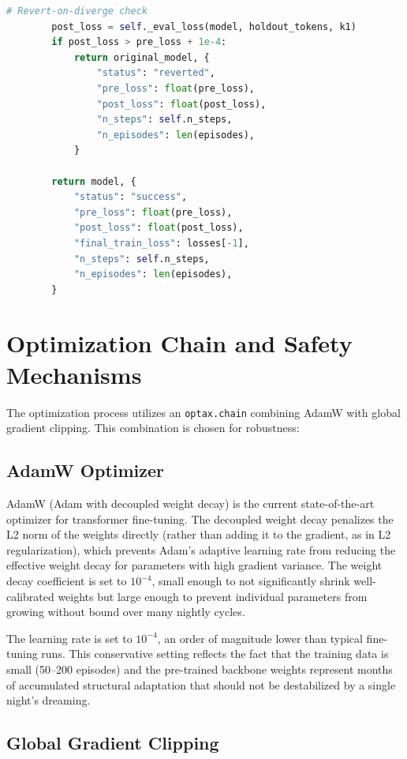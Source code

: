 \begin{lstlisting}[language=python]
        # Revert-on-diverge check
        post_loss = self._eval_loss(model, holdout_tokens, k1)
        if post_loss > pre_loss + 1e-4:
            return original_model, {
                "status": "reverted",
                "pre_loss": float(pre_loss),
                "post_loss": float(post_loss),
                "n_steps": self.n_steps,
                "n_episodes": len(episodes),
            }

        return model, {
            "status": "success",
            "pre_loss": float(pre_loss),
            "post_loss": float(post_loss),
            "final_train_loss": losses[-1],
            "n_steps": self.n_steps,
            "n_episodes": len(episodes),
        }
\end{lstlisting}

\section{Optimization Chain and Safety Mechanisms}

The optimization process utilizes an \texttt{optax.chain} combining AdamW with global gradient clipping. This combination is chosen for robustness:

\subsection{AdamW Optimizer}

AdamW (Adam with decoupled weight decay) is the current state-of-the-art optimizer for transformer fine-tuning. The decoupled weight decay penalizes the L2 norm of the weights directly (rather than adding it to the gradient, as in L2 regularization), which prevents Adam's adaptive learning rate from reducing the effective weight decay for parameters with high gradient variance. The weight decay coefficient is set to $10^{-4}$, small enough to not significantly shrink well-calibrated weights but large enough to prevent individual parameters from growing without bound over many nightly cycles.

The learning rate is set to $10^{-4}$, an order of magnitude lower than typical fine-tuning runs. This conservative setting reflects the fact that the training data is small (50--200 episodes) and the pre-trained backbone weights represent months of accumulated structural adaptation that should not be destabilized by a single night's dreaming.

\subsection{Global Gradient Clipping}

